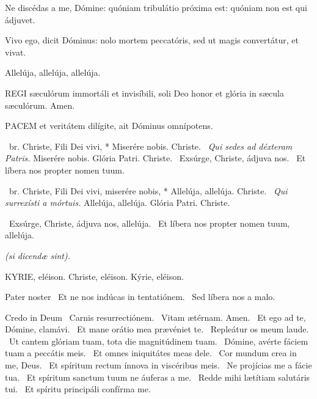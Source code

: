   Ne discédas a me, Dómine: quóniam tribulátio próxima est: quóniam non est qui ádjuvet.



 Vivo ego, dicit Dóminus: nolo mortem peccatóris, sed ut magis convertátur, et vivat.

  Allelúja, allelúja, allelúja.



\lettrine[lines=2]{R}{EGI} sæculórum immortáli et invisíbili, soli Deo honor et glória in sæcula sæculórum. Amen.



\lettrine[lines=2]{P}{ACEM} et veritátem dilígite, ait Dóminus omnípotens.

\R\ br. Christe, Fili Dei vivi, * Miserére nobis. Christe. \V\ \textit{Qui sedes ad déxteram Patris.} Miserére nobis. Glória Patri. Christe. \V\ Exsúrge, Christe, ádjuva nos. \R\ Et líbera nos propter nomen tuum.


\R\ br. Christe, Fili Dei vivi, miserére nobis, * Allelúja, allelúja. Christe. \V\ \textit{Qui surrexísti a mórtuis.} Allelúja, allelúja. Glória Patri. Christe.

\V\ Exsúrge, Christe, ádjuva nos, allelúja. \R\ Et líbera nos propter nomen tuum, allelúja.

\sectionornament


\textit{(si dicendæ sint).}

KYRIE, eléison. Christe, eléison. Kýrie, eléison.

Pater noster  \V\ Et ne nos indúcas in tentatiónem. \R\ Sed líbera nos a malo.

Credo in Deum  \V\ Carnis resurrectiónem. \R\ Vitam ætérnam. Amen. \V\ Et ego ad te, Dómine, clamávi. \R\ Et mane orátio mea prævéniet te. \V\ Repleátur os meum laude. \R\ Ut cantem glóriam tuam, tota die magnitúdinem tuam. \V\ Dómine, avérte fáciem tuam a peccátis meis. \R\ Et omnes iniquitátes meas dele. \V\ Cor mundum crea in me, Deus. \R\ Et spíritum rectum ínnova in viscéribus meis. \V\ Ne projícias me a fácie tua. \R\ Et spíritum sanctum tuum ne áuferas a me. \V\ Redde mihi lætítiam salutáris tui. \R\ Et spíritu principáli confírma me.

